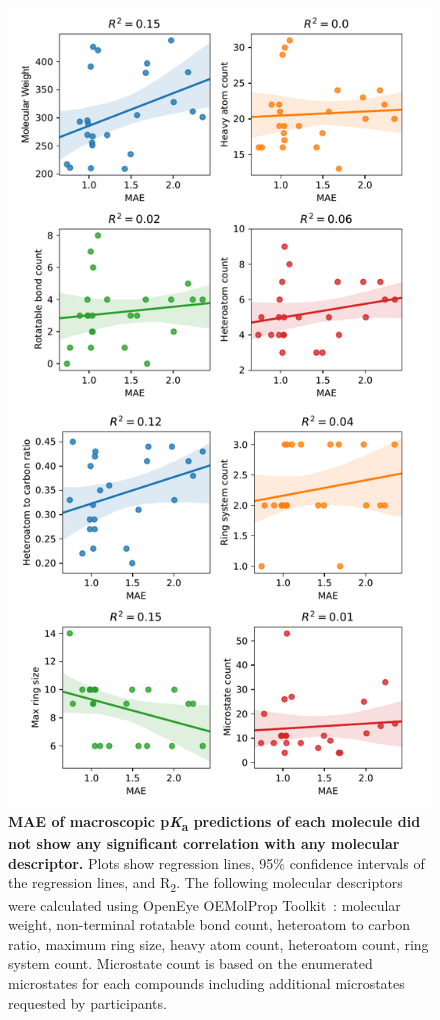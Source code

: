 \documentclass[9pt,lineno,final]{elife}
\newcommand{\pKa}{p\textit{K}\textsubscript{a}}
\begin{document}
\begin{figure}
\centering
\includegraphics[width=0.5\linewidth]{figures/molecular_properties_vs_MAE_correlation_fig.pdf}
\caption{ {\bf MAE of macroscopic \pKa{} predictions of each molecule did not show any significant correlation with any molecular descriptor.} 
Plots show regression lines, 95\% confidence intervals of the regression lines, and R\textsubscript{2}. 
The following molecular descriptors were calculated using OpenEye OEMolProp Toolkit~\citep{oemolprop_openeye_2017}: molecular weight, non-terminal rotatable bond count, heteroatom to carbon ratio, maximum ring size, heavy atom count, heteroatom count, ring system count. 
Microstate count is based on the enumerated microstates for each compounds including additional microstates requested by participants.
}
\label{fig:molecular_properties_vs_MAE_correlation}
\end{figure}
\end{document}
